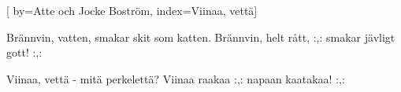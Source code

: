 [ 	
	by={Atte och Jocke Boström},					
	index={Viinaa, vettä}]		
	
\beginverse*						
Brännvin, vatten,
 smakar skit som katten. 
Brännvin, helt rått,
 :,: smakar jävligt gott! :,:
\endverse
						
\beginverse				
Viinaa, vettä 
- mitä perkelettä? 
Viinaa raakaa 
:,: napaan kaatakaa! :,:
\endverse			

\vspace{1cm}	
\endsong		
